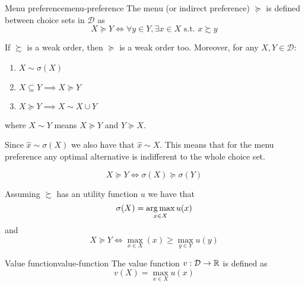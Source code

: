 \documentclass[12pt]{extarticle}
\begin{document}
\begin{definition}{Menu preference}{menu-preference}
    The menu (or indirect preference) $\succeq$ is defined between choice sets in $\mathcal D$ as
    \begin{equation}
        X \succeq Y \iff \forall y \in Y, \exists x \in X \text{ s.t. } x \succsim y
    \end{equation}
\end{definition}

\begin{proposition}{}{}
    If $\succsim$ is a weak order, then $\succeq$ is a weak order too.
    Moreover, for any $X, Y \in \mathcal D$:
    \begin{enumerate}[label=\roman*.]
        \item $X \sim \sigma (X)$
        \item $X \subseteq Y \implies X \succeq Y$
        \item $X \succeq Y \implies X \sim X \cup Y$
    \end{enumerate}
    where $X \sim Y$ means $X \succeq Y$ and $Y \succeq X$.
\end{proposition}

Since $\hat x \sim \sigma(X)$ we also have that $\hat x \sim X$.
This means that for the menu preference any optimal alternative is indifferent to the whole choice set.

\begin{corollary}{}{}
    \begin{equation}
        X \succeq Y \iff \sigma(X) \succeq \sigma(Y)
    \end{equation}
\end{corollary}

Assuming $\succsim$ has an utility function $u$ we have that
\begin{equation}
    \sigma(X) = \operatorname*{arg\,max}_{x \in X} u(x)
\end{equation}
and
\begin{equation}
    X \succeq Y \iff \max_{x \in X} (x) \geq \max_{y \in Y} u(y)
\end{equation}

\begin{definition}{Value function}{value-function}
    The value function $v: \mathcal D \to \mathbb{R}$ is defined as
    \begin{equation}
        v(X) = \max_{x \in X} u(x)
    \end{equation}
\end{definition}
\end{document}
